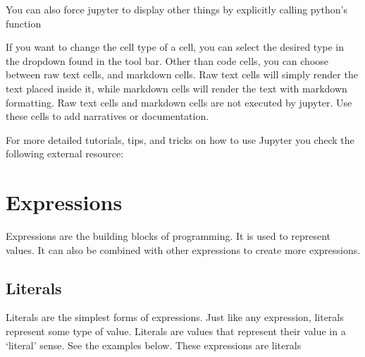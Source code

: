 \documentclass[letterpaper,10pt,english]{jupyterBook}
\begin{document}
\sphinxAtStartPar
You can also force jupyter to display other things by explicitly calling python’s  function

\sphinxAtStartPar
{}

\sphinxAtStartPar
If you want to change the cell type of a cell, you can select the desired type in the dropdown found in the tool bar. Other than code cells, you can choose between raw text cells, and markdown cells. Raw text cells will simply render the text placed inside it, while markdown cells will render the text with markdown formatting. Raw text cells and markdown cells are not executed by jupyter. Use these cells to add narratives or documentation.

\sphinxAtStartPar
For more detailed tutorials, tips, and tricks on how to use Jupyter you check the following external resource:

\sphinxAtStartPar
{}

\sphinxstepscope


\chapter{Expressions}
\label{\detokenize{expressions:expressions}}\label{\detokenize{expressions::doc}}
\sphinxAtStartPar
Expressions are the building blocks of programming. It is used to represent values. It can also be combined with other expressions to create more expressions.


\section{Literals}
\label{\detokenize{expressions:literals}}
\sphinxAtStartPar
Literals are the simplest forms of expressions. Just like any expression, literals represent some type of value. Literals are values that represent their value in a ‘literal’ sense. See the examples below. These expressions are literals
\end{document}
